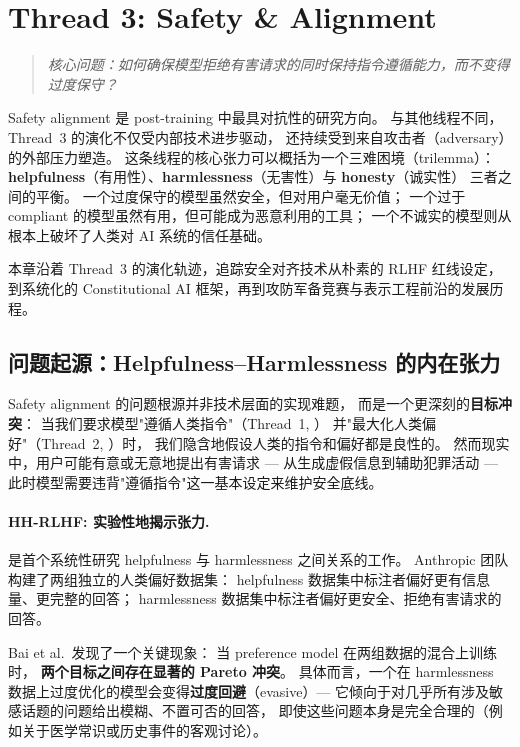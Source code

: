 \section{Thread 3: Safety \& Alignment}
\label{sec:t3}

\begin{quote}
\textit{核心问题：如何确保模型拒绝有害请求的同时保持指令遵循能力，而不变得过度保守？}
\end{quote}

\noindent
Safety alignment 是 post-training 中最具对抗性的研究方向。
与其他线程不同，Thread~3 的演化不仅受内部技术进步驱动，
还持续受到来自攻击者（adversary）的外部压力塑造。
这条线程的核心张力可以概括为一个三难困境（trilemma）：
\textbf{helpfulness}（有用性）、\textbf{harmlessness}（无害性）与 \textbf{honesty}（诚实性）
三者之间的平衡。
一个过度保守的模型虽然安全，但对用户毫无价值；
一个过于 compliant 的模型虽然有用，但可能成为恶意利用的工具；
一个不诚实的模型则从根本上破坏了人类对 AI 系统的信任基础。

本章沿着 Thread~3 的演化轨迹，追踪安全对齐技术从朴素的 RLHF 红线设定，
到系统化的 Constitutional AI 框架，再到攻防军备竞赛与表示工程前沿的发展历程。

\subsection{问题起源：Helpfulness--Harmlessness 的内在张力}
\label{sec:t3-origin}

Safety alignment 的问题根源并非技术层面的实现难题，
而是一个更深刻的\textbf{目标冲突}：
当我们要求模型"遵循人类指令"（Thread~1, ）
并"最大化人类偏好"（Thread~2, ）时，
我们隐含地假设人类的指令和偏好都是良性的。
然而现实中，用户可能有意或无意地提出有害请求 ---
从生成虚假信息到辅助犯罪活动 ---
此时模型需要违背"遵循指令"这一基本设定来维护安全底线。

\paragraph{HH-RLHF: 实验性地揭示张力.}
 是首个系统性研究 helpfulness 与 harmlessness 之间关系的工作。
Anthropic 团队构建了两组独立的人类偏好数据集：
helpfulness 数据集中标注者偏好更有信息量、更完整的回答；
harmlessness 数据集中标注者偏好更安全、拒绝有害请求的回答。

\begin{problembox}
Bai et al.\ 发现了一个关键现象：
当 preference model 在两组数据的混合上训练时，
\textbf{两个目标之间存在显著的 Pareto 冲突}。
具体而言，一个在 harmlessness 数据上过度优化的模型会变得\textbf{过度回避}（evasive）---
它倾向于对几乎所有涉及敏感话题的问题给出模糊、不置可否的回答，
即使这些问题本身是完全合理的（例如关于医学常识或历史事件的客观讨论）。
\end{problembox}

